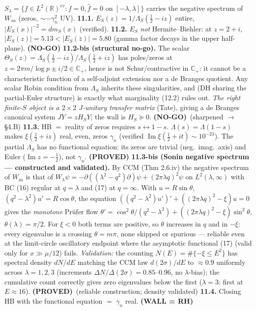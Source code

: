 \documentclass[11pt]{amsart}
\theoremstyle{definition}
\theoremstyle{remark}
\newcommand{\PROVED}{\textbf{(PROVED)}}
\newcommand{\NOGO}{\textbf{(NO-GO)}}
\newcommand{\WALL}{\textbf{(WALL = RH)}}
\begin{document}
$S_\lambda=\{f\in L^2(\mathbb R)^{ev}:f=0,\hat f=0\text{ on }[-\lambda,\lambda]\}$ carries the
negative spectrum of $W_{sa}$ (zeros, $\sim-\gamma_n^2$ UV).
\textbf{11.1.} $E_S(z)=1/\Lambda_S(\tfrac12-iz)$ entire, $|E_S(x)|^{-2}=dm_S(x)$ (verified).
\textbf{11.2.} $E_S$ \emph{not} Hermite--Biehler: at $z=2+i$, $|E_S(z)|=5.13<|E_S(\bar z)|=5.80$
(gamma factor decays in the upper half-plane). \NOGO
\textbf{11.2-bis (structural no-go).} The scalar
$\Theta_S(z)=\Lambda_S(\tfrac12-iz)/\Lambda_S(\tfrac12+iz)$ has poles/zeros at
$z=2\pi m/\log p\pm i/2\in\mathbb C_+$, hence is not Schur/contractive in $\mathbb C_+$: it cannot
be a characteristic function of a self-adjoint extension nor a de Branges quotient. Any scalar
Robin condition from $\Lambda_S$ inherits these singularities, and (DH sharing the partial-Euler
structure) is exactly what marginality (12.2) rules out. \emph{The right finite-$S$ object is a
$2\times2$ $J$-unitary transfer matrix} (Tate), giving a de Branges canonical system $J\dot
Y=zH_SY$; the wall is $H_S\succeq0$. \NOGO\ (sharpened $\to$ \S4.B)
\textbf{11.3.} HB $=$ reality of zeros requires $s\leftrightarrow1-s$. $\Lambda(s)=\Lambda(1-s)$
makes $\xi(\tfrac12+iz)$ real, even, zeros $\gamma_n$ (verified
$\operatorname{Im}\xi(\tfrac12+it)\sim10^{-23}$). The partial $\Lambda_S$ has no functional
equation: its zeros are trivial (neg.\ imag.\ axis) and Euler ($\operatorname{Im}z=-\tfrac12$),
not $\gamma_n$. \PROVED
\textbf{11.3-bis (Sonin negative spectrum --- constructed and validated).} By CCM
(Thm 2.6.iv) the negative spectrum of $W_{\mathrm{sa}}$ is that of
$W_\lambda\psi=-\partial((\lambda^2-q^2)\partial)\psi+(2\pi\lambda q)^2\psi$ on $L^2(\lambda,\infty)$
with BC (16) regular at $q=\lambda$ and (17) at $q=\infty$. With $u=R\sin\theta$,
$(q^2-\lambda^2)u'=R\cos\theta$, the equation
$((q^2-\lambda^2)u')'+((2\pi\lambda q)^2-\xi)u=0$ gives the \emph{monotone} Pr\"ufer flow
$\theta'=\cos^2\theta/(q^2-\lambda^2)+((2\pi\lambda q)^2-\xi)\sin^2\theta$, $\theta(\lambda)=\pi/2$.
For $\xi<0$ both terms are positive, so $\theta$ increases in $q$ and in $-\xi$: every eigenvalue
is a crossing $\theta=m\pi$, none skipped or spurious --- reliable even at the limit-circle
oscillatory endpoint where the asymptotic functional (17) (valid only for $x\gg\mu/12$) fails.
\emph{Validation:} the counting $N(E)=\#\{-\xi\le E^2\}$ has spectral density $dN/dE$ matching the
CCM law $d(2\sigma)/dE$ to $\approx0.9$ uniformly across $\lambda=1,2,3$ (increments
$\Delta N/\Delta(2\sigma)=0.85$--$0.96$, no $\lambda$-bias); the cumulative count correctly gives
zero eigenvalues below the first ($\lambda=3$: first at $E\approx16$). \PROVED\ (reliable
construction; density validated)
\textbf{11.4.} Closing HB with the functional equation $=$ $\gamma_n$ real. \WALL
\end{document}
